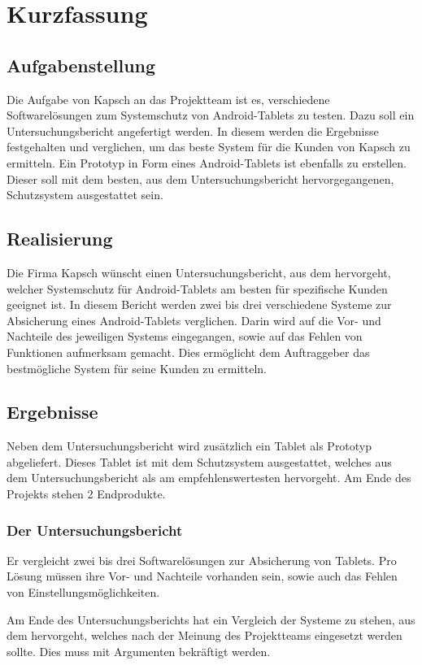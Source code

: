 \thispagestyle{empty}
\chapter*{Kurzfassung}
\section*{Aufgabenstellung}
Die Aufgabe von Kapsch an das Projektteam ist es, verschiedene Softwarelösungen zum Systemschutz von Android-Tablets zu testen. Dazu soll ein Untersuchungsbericht angefertigt werden. In diesem werden die Ergebnisse  festgehalten und verglichen, um das beste System für die Kunden von Kapsch zu ermitteln. Ein Prototyp in Form eines Android-Tablets ist ebenfalls zu erstellen. Dieser soll mit dem besten, aus dem Untersuchungsbericht hervorgegangenen, Schutzsystem ausgestattet sein.
\section*{Realisierung}
Die Firma Kapsch wünscht einen Untersuchungsbericht, aus dem hervorgeht, welcher Systemschutz für Android-Tablets am besten für spezifische Kunden geeignet ist. In diesem Bericht werden zwei bis drei verschiedene Systeme zur Absicherung eines Android-Tablets verglichen. Darin wird auf die Vor- und Nachteile des jeweiligen Systems eingegangen, sowie auf das Fehlen von Funktionen aufmerksam gemacht. Dies ermöglicht dem Auftraggeber das bestmögliche System für seine Kunden zu ermitteln.
\section*{Ergebnisse}
Neben dem Untersuchungsbericht wird zusätzlich ein Tablet als Prototyp abgeliefert. Dieses Tablet ist mit dem Schutzsystem ausgestattet, welches aus dem Untersuchungsbericht als am empfehlenswertesten hervorgeht.
\newline Am Ende des Projekts stehen 2 Endprodukte. 
\subsection*{Der Untersuchungsbericht}
Er vergleicht zwei bis drei Softwarelösungen zur Absicherung von Tablets. Pro Lösung müssen ihre Vor- und Nachteile vorhanden sein, sowie auch das Fehlen von Einstellungsmöglichkeiten. 

Am Ende des Untersuchungsberichts hat ein Vergleich der Systeme zu stehen, aus dem hervorgeht, welches nach der Meinung des Projektteams eingesetzt werden sollte. Dies muss mit Argumenten bekräftigt werden.
\newpage
